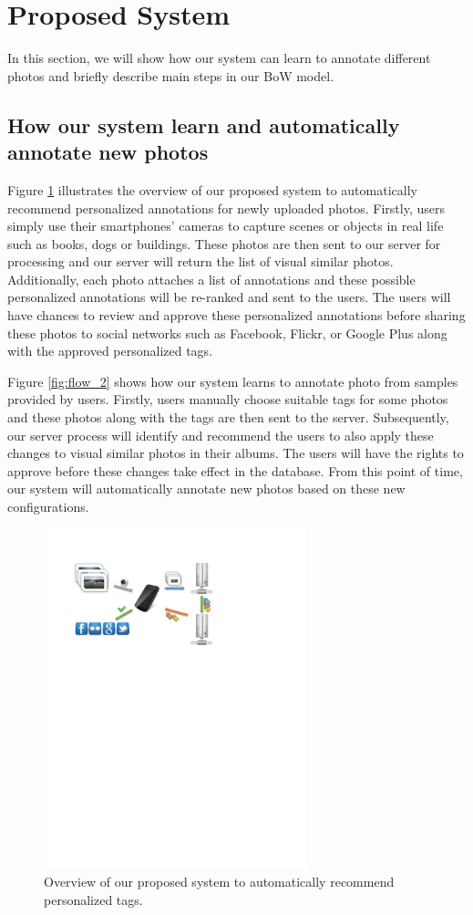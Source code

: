 \section{Proposed System} \label{section:proposed_system}

In this section, we will show how our system can learn to annotate different photos and briefly describe main steps in our BoW model.

\subsection {How our system learn and automatically annotate new photos} \label{section:main_flow}

Figure \ref{fig:flow_1} illustrates the overview of our proposed system to automatically recommend personalized annotations for newly uploaded photos. Firstly, users simply use their smartphones’ cameras to capture scenes or objects in real life such as books, dogs or buildings. These photos are then sent to our server for processing and our server will return the list of visual similar photos. Additionally, each photo attaches a list of annotations and these possible personalized annotations will be re-ranked and sent to the users. The users will have chances to review and approve these personalized annotations before sharing these photos to social networks such as Facebook, Flickr, or Google Plus along with the approved personalized tags.

Figure \ref{fig:flow_2} shows how our system learns to annotate photo from samples provided by users. Firstly, users manually choose suitable tags for some photos and these photos along with the tags are then sent to the server. Subsequently, our server process will identify and recommend the users to also apply these changes to visual similar photos in their albums. The users will have the rights to approve before these changes take effect in the database. From this point of time, our system will automatically annotate new photos based on these new configurations.

\begin{figure}
    \centering
    \includegraphics[width=3.0in]{flow1.pdf}
    \caption{Overview of our proposed system to automatically recommend personalized tags.}
    \label{fig:flow_1}
\end{figure}

